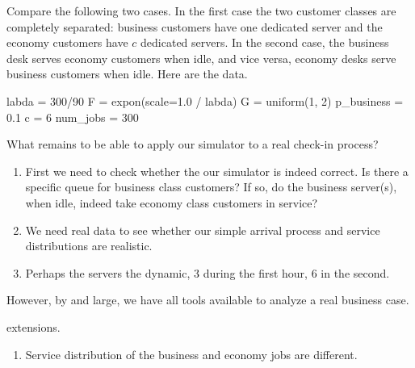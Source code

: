 \begin{exercise}
Compare the following two cases. In the first case the two customer classes are completely separated:  business customers have one dedicated server and the economy customers have $c$ dedicated servers.  In the second case, the business desk serves economy customers when idle, and vice versa, economy desks serve business customers when idle.  Here are the data. 
  \begin{pyverbatim}
labda = 300/90
F = expon(scale=1.0 / labda)
G = uniform(1, 2)
p_business = 0.1
c = 6
num_jobs = 300
  \end{pyverbatim}
  


\end{exercise}




\begin{exercise}
  What remains to be able to apply our simulator to a real check-in process?
  \begin{solution}
    \begin{enumerate}
    \item First we need to check whether the our simulator is indeed correct. Is there a specific queue for business class customers? If so, do the business server(s), when idle, indeed take economy class customers in service? 
    \item We need real data to see whether our simple arrival process and service distributions are realistic. 
    \item Perhaps the servers the dynamic, 3 during the first hour, 6 in the second. 
    \end{enumerate}

However, by and large, we have all tools available to analyze a real business case.
  \end{solution}
\end{exercise}

extensions.
\begin{enumerate}
\item Service distribution of the business and economy jobs are different.
\end{enumerate}













